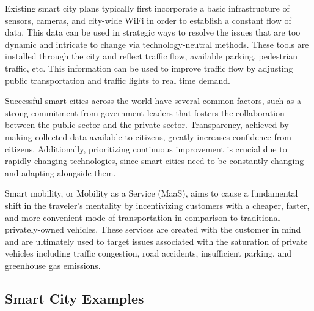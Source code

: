 \documentclass[12pt]{article}                       %
\begin{document}
Existing smart city plans typically first incorporate a basic infrastructure of sensors, cameras, and city-wide WiFi in order to establish a constant flow of data. This data can be used in strategic ways to resolve the issues that are too dynamic and intricate to change via technology-neutral methods. These tools are installed through the city and reflect traffic flow, available parking, pedestrian traffic, etc. This information can be used to improve traffic flow by adjusting public transportation and traffic lights to real time demand. 

Successful smart cities across the world have several common factors, such as a strong commitment from government leaders that fosters the collaboration between the public sector and the private sector. Transparency, achieved by making collected data available to citizens, greatly increases confidence from citizens. Additionally, prioritizing continuous improvement is crucial due to rapidly changing technologies, since smart cities need to be constantly changing and adapting alongside them. 

Smart mobility, or Mobility as a Service (MaaS), aims to cause a fundamental shift in the traveler's mentality by incentivizing customers with a cheaper, faster, and more convenient mode of transportation in comparison to traditional privately-owned vehicles. These services are created with the customer in mind and are ultimately used to target issues associated with the saturation of private vehicles including traffic congestion, road accidents, insufficient parking, and greenhouse gas emissions.

\subsection{Smart City Examples}
\end{document}

